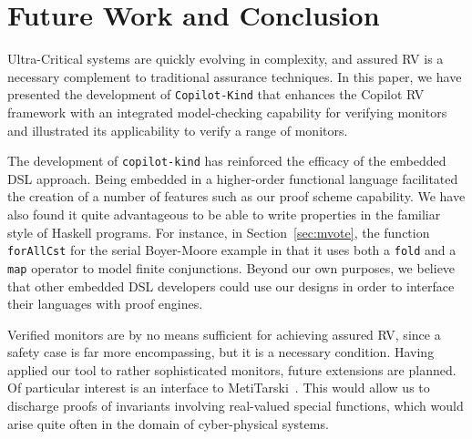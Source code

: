 \section{Future Work and Conclusion}\label{sec:conclusion}

 Ultra-Critical systems are quickly evolving in complexity, and assured
 RV is a necessary complement to traditional assurance techniques.  
In this paper, we have presented the development of
\texttt{Copilot-Kind} that enhances the Copilot RV framework with an
integrated model-checking capability for verifying monitors and
illustrated its applicability to verify a range of monitors.


The development of \texttt{copilot-kind} has reinforced the efficacy
of the embedded DSL approach. Being embedded in a higher-order
functional language facilitated the creation of a number of features
such as our proof scheme capability. We have also found it quite
advantageous to be able to write properties in the familiar style of
Haskell programs. For instance, in Section~\ref{sec:mvote}, the
function \texttt{forAllCst} for the serial Boyer-Moore example in that
it uses both a \texttt{fold} and a \texttt{map} operator to model
finite conjunctions.  Beyond our own purposes, we believe that other
embedded DSL developers could use our designs in order to interface
their languages with proof engines.

Verified  monitors are by no means sufficient for achieving assured RV,
since a safety case is far more encompassing, but it is a necessary
condition.  Having applied our tool to rather
sophisticated monitors,  future extensions are planned.  Of particular
interest is an interface to 
MetiTarski~\cite{AkbarpourPaulson}. This would allow us to discharge
proofs of invariants involving real-valued special functions, which
would arise quite often in the domain of cyber-physical systems.
 